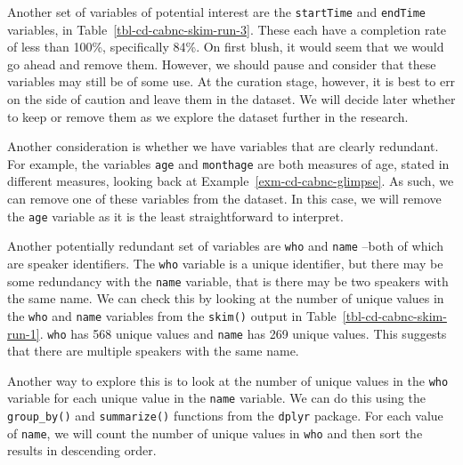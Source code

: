 \documentclass[
  letterpaper,
  DIV=11,
  numbers=noendperiod]{scrreport}
\theoremstyle{definition}
\theoremstyle{remark}
\begin{document}
Another set of variables of potential interest are the
\texttt{startTime} and \texttt{endTime} variables, in
Table~\ref{tbl-cd-cabnc-skim-run-3}. These each have a completion rate
of less than 100\%, specifically 84\%. On first blush, it would seem
that we would go ahead and remove them. However, we should pause and
consider that these variables may still be of some use. At the curation
stage, however, it is best to err on the side of caution and leave them
in the dataset. We will decide later whether to keep or remove them as
we explore the dataset further in the research.

Another consideration is whether we have variables that are clearly
redundant. For example, the variables \texttt{age} and \texttt{monthage}
are both measures of age, stated in different measures, looking back at
Example~\ref{exm-cd-cabnc-glimpse}. As such, we can remove one of these
variables from the dataset. In this case, we will remove the
\texttt{age} variable as it is the least straightforward to interpret.

Another potentially redundant set of variables are \texttt{who} and
\texttt{name} --both of which are speaker identifiers. The \texttt{who}
variable is a unique identifier, but there may be some redundancy with
the \texttt{name} variable, that is there may be two speakers with the
same name. We can check this by looking at the number of unique values
in the \texttt{who} and \texttt{name} variables from the \texttt{skim()}
output in Table~\ref{tbl-cd-cabnc-skim-run-1}. \texttt{who} has 568
unique values and \texttt{name} has 269 unique values. This suggests
that there are multiple speakers with the same name.

Another way to explore this is to look at the number of unique values in
the \texttt{who} variable for each unique value in the \texttt{name}
variable. We can do this using the \texttt{group\_by()} and
\texttt{summarize()} functions from the \texttt{dplyr} package. For each
value of \texttt{name}, we will count the number of unique values in
\texttt{who} and then sort the results in descending order.
\end{document}
